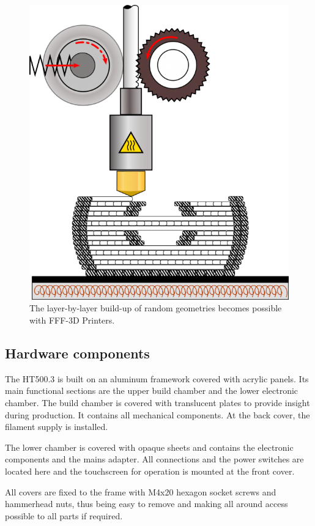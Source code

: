 \begin{figure}[H]
  \centering
  \includegraphics[width=.7\linewidth]{./img/fff_principle_manual.png}
  \caption{The layer-by-layer build-up of random geometries becomes possible with FFF-3D Printers.}
\end{figure}



\subsection{Hardware components}

The HT500.3 is built on an aluminum framework covered with acrylic panels. Its main functional sections are the upper build chamber and the lower electronic chamber. The build chamber is covered with translucent plates to provide insight during production. It contains all mechanical components. At the back cover, the filament supply is installed.

The lower chamber is covered with opaque sheets and contains the electronic components and the mains adapter. All connections and the power switches are located here and the touchscreen for operation is mounted at the front cover.

All covers are fixed to the frame with M4x20 hexagon socket screws and hammerhead nuts, thus being easy to remove and making all around access possible to all parts if required. 

